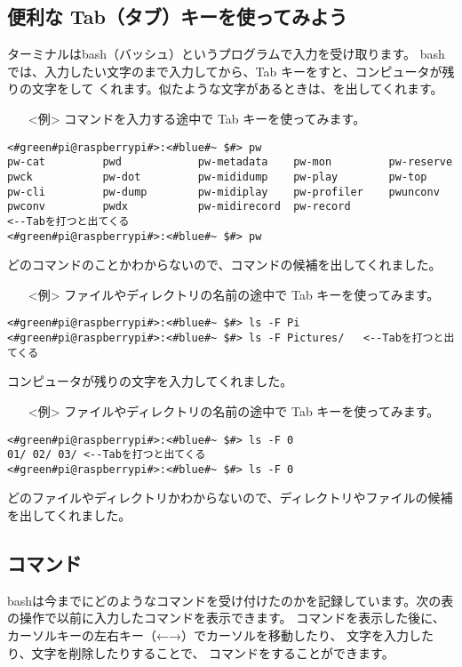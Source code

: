 \subsection{便利な Tab（タブ）キーを使ってみよう}
ターミナルはbash（バッシュ）というプログラムで入力を受け取ります。
bashでは、入力したい文字のまで入力してから、Tab キーをすと、コンピュータが残りの文字をして
くれます。似たような文字があるときは、を出してくれます。
\newpage
\begin{itemize}
\item[<例>]コマンドを入力する途中で Tab キーを使ってみます。
\end{itemize}
\begin{lstlisting}[caption=Tabの例1, label=Tab1]
<#green#pi@raspberrypi#>:<#blue#~ $#> pw
pw-cat         pwd            pw-metadata    pw-mon         pw-reserve
pwck           pw-dot         pw-mididump    pw-play        pw-top
pw-cli         pw-dump        pw-midiplay    pw-profiler    pwunconv
pwconv         pwdx           pw-midirecord  pw-record                 <--Tabを打つと出てくる
<#green#pi@raspberrypi#>:<#blue#~ $#> pw
\end{lstlisting}
どのコマンドのことかわからないので、コマンドの候補を出してくれました。
\begin{itemize}
\item[<例>]ファイルやディレクトリの名前の途中で Tab キーを使ってみます。
\end{itemize}
\begin{lstlisting}[caption=Tabの例2, label=Tab2]
<#green#pi@raspberrypi#>:<#blue#~ $#> ls -F Pi
<#green#pi@raspberrypi#>:<#blue#~ $#> ls -F Pictures/	<--Tabを打つと出てくる
\end{lstlisting}
コンピュータが残りの文字を入力してくれました。
\begin{itemize}
\item[<例>]ファイルやディレクトリの名前の途中で Tab キーを使ってみます。
\end{itemize}
\begin{lstlisting}[caption=Tabの例3, label=Tab3]
<#green#pi@raspberrypi#>:<#blue#~ $#> ls -F 0
01/	02/	03/	<--Tabを打つと出てくる
<#green#pi@raspberrypi#>:<#blue#~ $#> ls -F 0
\end{lstlisting}
どのファイルやディレクトリかわからないので、ディレクトリやファイルの候補を出してくれました。

\subsection{コマンド}
bashは今までにどのようなコマンドを受け付けたのかを記録しています。次の表の操作で以前に入力したコマンドを表示できます。
コマンドを表示した後に、カーソルキーの左右キー（←→）でカーソルを移動したり、
文字を入力したり、文字を削除したりすることで、
コマンドをすることができます。

